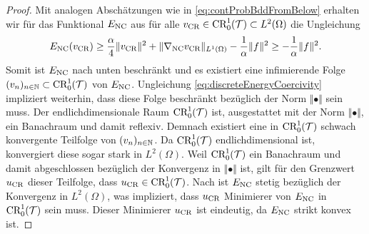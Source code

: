 \begin{proof}
  Mit analogen Abschätzungen wie in \eqref{eq:contProbBddFromBelow}
  erhalten wir für das Funktional $E_\textup{NC}$ aus  
  für alle $v_\textup{CR}\in\textup{CR}^1_0(\mathcal{T})\subset L^2(\Omega)$ die Ungleichung 
  \begin{equation}
    \label{eq:discreteEnergyCoercivity}
    E_\textup{NC}(v_\textup{CR}) 
    \geq 
    \frac{\alpha}{4}\Vert v_\textup{CR}\Vert^2
    +\Vert \nabla_\textup{NC}v_\textup{CR}\Vert_{L^1(\Omega)}
    -\frac{1}{\alpha}\Vert f\Vert^2
    \geq 
    -\frac{1}{\alpha}\Vert f\Vert^2.
  \end{equation}
  Somit ist $E_\textup{NC}$ nach unten beschränkt und es existiert eine infimierende
  Folge $(v_n)_{n\in\mathbb{N}} \subset \textup{CR}^1_0(\mathcal{T})$ von $E_\textup{NC}$. 
  Ungleichung \eqref{eq:discreteEnergyCoercivity} impliziert weiterhin, dass
  diese Folge beschränkt bezüglich der Norm $\Vert\bullet\Vert$ sein muss.
  Der endlichdimensionale Raum $\textup{CR}^1_0(\mathcal{T})$ ist, ausgestattet mit der Norm
  $\Vert\bullet\Vert$, ein Banachraum und damit reflexiv. 
  Demnach existiert eine in $\textup{CR}^1_0(\mathcal{T})$ schwach konvergente Teilfolge von
  $(v_n)_{n\in\mathbb{N}}$.
  Da $\textup{CR}^1_0(\mathcal{T})$ endlichdimensional ist, konvergiert diese sogar stark
  in $L^2(\Omega)$. 
  Weil $\textup{CR}^1_0(\mathcal{T})$ ein Banachraum und damit abgeschlossen bezüglich der
  Konvergenz in $\Vert\bullet\Vert$ ist, gilt für den Grenzwert $u_\textup{CR}$ dieser
  Teilfolge, dass $u_\textup{CR}\in\textup{CR}^1_0(\mathcal{T})$.
  Nach  ist $E_\textup{NC}$ stetig bezüglich der
  Konvergenz in $L^2(\Omega)$, was impliziert, dass $u_\textup{CR}$ Minimierer von
  $E_\textup{NC}$ in $\textup{CR}^1_0(\mathcal{T})$ sein muss.   
  Dieser Minimierer $u_\textup{CR}$ ist eindeutig, da $E_\textup{NC}$ strikt konvex ist.
\end{proof}

